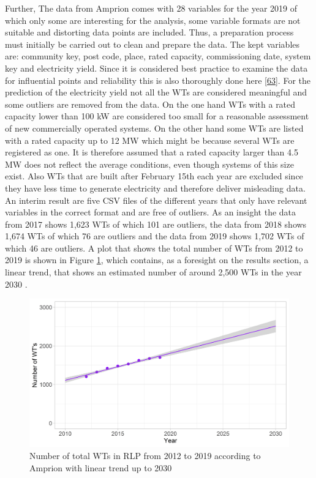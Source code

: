 \documentclass[a4paper,11pt]{article}
\begin{document}
Further, The data from Amprion comes with 28 variables for the year 2019 of which only some are interesting for the analysis, some variable formats are not suitable and distorting data points are included. Thus, a preparation process must initially be carried out to clean and prepare the data. The kept variables are: community key, post code, place, rated capacity, commissioning date, system key and electricity yield. Since it is considered best practice to examine the data for influential points and reliability this is also thoroughly done here {[}\protect\hyperlink{ref-JasonW.Osborne.2013}{63}{]}. For the prediction of the electricity yield not all the WTs are considered meaningful and some outliers are removed from the data. On the one hand WTs with a rated capacity lower than 100 kW are considered too small for a reasonable assessment of new commercially operated systems. On the other hand some WTs are listed with a rated capacity up to 12 MW which might be because several WTs are registered as one. It is therefore assumed that a rated capacity larger than 4.5 MW does not reflect the average conditions, even though systems of this size exist. Also WTs that are built after February 15th each year are excluded since they have less time to generate electricity and therefore deliver misleading data. An interim result are five CSV files of the different years that only have relevant variables in the correct format and are free of outliers. As an insight the data from 2017 shows 1,623 WTs of which 101 are outliers, the data from 2018 shows 1,674 WTs of which 76 are outliers and the data from 2019 shows 1,702 WTs of which 46 are outliers. A plot that shows the total number of WTs from 2012 to 2019 is shown in Figure \ref{fig:yearswts}, which contains, as a foresight on the results section, a linear trend, that shows an estimated number of around 2,500 WTs in the year 2030 .
\begin{figure}[H]

{\centering \includegraphics[width=1\linewidth]{data/Amprion/results_of_analysis/year_wts} 

}

\caption{Number of total WTs in RLP from 2012 to 2019 according to Amprion with linear trend up to 2030}\label{fig:yearswts}
\end{figure}
\end{document}
